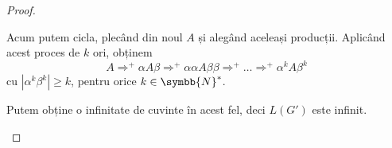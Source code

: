 \documentclass{article}
\newcommand{\abs}[1]{\left\lvert #1 \right\rvert}
\newcommand{\naturals}{\symbb{N}}
\begin{document}
\begin{enumerate}
\begin{proof}
\begin{itemize}
        Acum putem cicla, plecând din noul \(A\) și alegând aceleași producții. Aplicând acest proces de \(k\) ori, obținem
        \[
            A \Rightarrow^+ \alpha A \beta
            \Rightarrow^+ \alpha \alpha A \beta \beta
            \Rightarrow^+ \dots
            \Rightarrow^+ \alpha^k A \beta^k
        \]
        cu \(\abs{\alpha^k \beta^k} \geq k\), pentru orice \(k \in \naturals^*\).
        
        Putem obține o infinitate de cuvinte în acest fel, deci \(L(G')\) este infinit.
    \end{itemize}
    \end{proof}
\end{enumerate}
\end{document}

